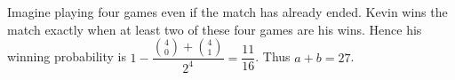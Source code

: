 Imagine playing four games even if the match has already ended. Kevin wins the match exactly when at least two of these four games are his wins. Hence his winning probability is $1-\dfrac{\binom40+\binom41}{2^4}=\dfrac{11}{16}$. Thus $a+b=\boxed{27}$.
